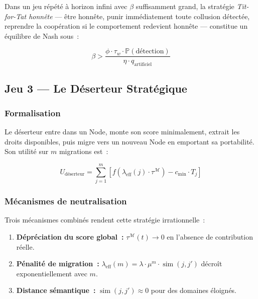 \documentclass[12pt,a4paper]{article}
\theoremstyle{definition}
\theoremstyle{plain}
\theoremstyle{remark}
\newcommand{\trustscore}{\tau}
\newcommand{\1}{\mathbf{1}}
\begin{document}
Dans un jeu répété à horizon infini avec $\beta$ suffisamment grand, la
stratégie \textit{Tit-for-Tat honnête} --- être honnête, punir immédiatement
toute collusion détectée, reprendre la coopération si le comportement redevient
honnête --- constitue un équilibre de Nash sous~:

\begin{equation}
\beta > \frac{\phi \cdot \trustscore_w \cdot \mathbb{P}(\text{détection})}{\eta \cdot q_{\text{artificiel}}}
\label{eq:tft}
\end{equation}

\subsection{Jeu 3 --- Le Déserteur Stratégique}

\subsubsection{Formalisation}

Le déserteur entre dans un Node, monte son score minimalement, extrait les
droits disponibles, puis migre vers un nouveau Node en emportant sa
portabilité. Son utilité sur $m$ migrations est~:

\begin{equation}
U_{\text{déserteur}} = \sum_{j=1}^{m} \left[f(\lambda_{\text{eff}}(j) \cdot \trustscore^{\mathcal{M}}) - c_{\min} \cdot T_j\right]
\end{equation}

\subsubsection{Mécanismes de neutralisation}

Trois mécanismes combinés rendent cette stratégie irrationnelle~:

\begin{enumerate}
  \item \textbf{Dépréciation du score global~:} $\trustscore^{\mathcal{M}}(t) \to 0$ en l'absence de contribution réelle.
  \item \textbf{Pénalité de migration~:} $\lambda_{\text{eff}}(m) = \lambda \cdot \mu^m \cdot \operatorname{sim}(j, j')$ décroît exponentiellement avec $m$.
  \item \textbf{Distance sémantique~:} $\operatorname{sim}(j, j') \approx 0$ pour des domaines éloignés.
\end{enumerate}
\end{document}
